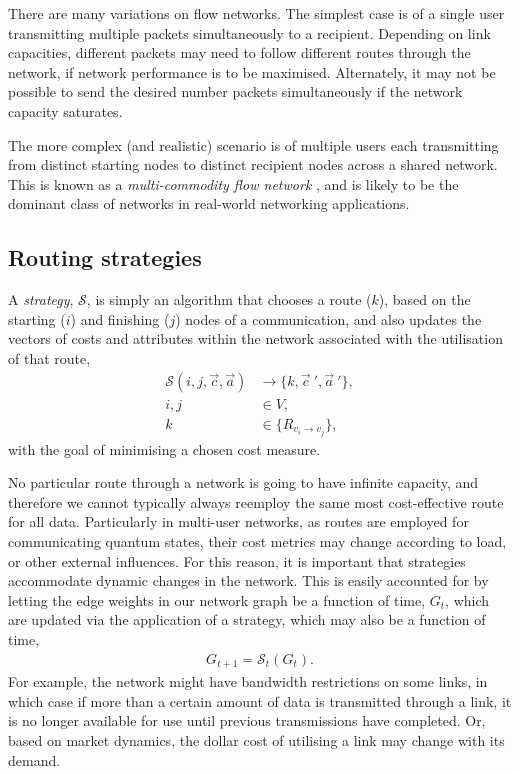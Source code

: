 \documentclass[aps,rmp,twocolumn,amsmath,amssymb,nofootinbib,superscriptaddress,longbibliography,floatfix]{revtex4-1}
\begin{document}
There are many variations on flow networks. The simplest case is of a single user transmitting multiple packets simultaneously to a recipient. Depending on link capacities, different packets may need to follow different routes through the network, if network performance is to be maximised. Alternately, it may not be possible to send the desired number packets simultaneously if the network capacity saturates.

The more complex (and realistic) scenario is of multiple users each transmitting from distinct starting nodes to distinct recipient nodes across a shared network. This is known as a \emph{multi-commodity flow network} \cite{???}, and is likely to be the dominant class of networks in real-world networking applications.

%
%

\subsection{Routing strategies} \label{sec:route_strats}

A \emph{strategy}, $\mathcal{S}$, is simply an algorithm that chooses a route ($k$), based on the starting ($i$) and finishing ($j$) nodes of a communication, and also updates the vectors of costs and attributes within the network associated with the utilisation of that route,
\begin{align}
\mathcal{S}(i,j,\vec{c},\vec{a}) &\to \{k,{\vec{c}}~',{\vec{a}}~'\}, \nonumber \\
i,j &\in V, \nonumber\\
k &\in \{R_{v_i\to v_j}\},
\end{align}
with the goal of minimising a chosen cost measure.

No particular route through a network is going to have infinite capacity, and therefore we cannot typically always reemploy the same most cost-effective route for all data. Particularly in multi-user networks, as routes are employed for communicating quantum states, their cost metrics may change according to load, or other external influences. For this reason, it is important that strategies accommodate dynamic changes in the network. This is easily accounted for by letting the edge weights in our network graph be a function of time, $G_t$, which are updated via the application of a strategy, which may also be a function of time,
\begin{align} \label{eq:S_G}
G_{t+1} = \mathcal{S}_t(G_t).
\end{align}
For example, the network might have bandwidth restrictions on some links, in which case if more than a certain amount of data is transmitted through a link, it is no longer available for use until previous transmissions have completed. Or, based on market dynamics, the dollar cost of utilising a link may change with its demand.
\end{document}
